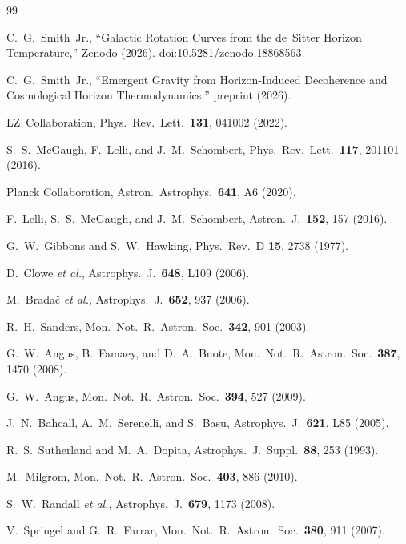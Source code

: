 \documentclass[aps,prd,twocolumn,superscriptaddress,nofootinbib]{revtex4-2}
\begin{document}
\begin{thebibliography}{99}

 C.~G.~Smith~Jr., ``Galactic Rotation Curves from the de~Sitter Horizon Temperature,'' Zenodo (2026). doi:10.5281/zenodo.18868563.

 C.~G.~Smith~Jr., ``Emergent Gravity from Horizon-Induced Decoherence and Cosmological Horizon Thermodynamics,'' preprint (2026).

 LZ~Collaboration, Phys.\ Rev.\ Lett.\ \textbf{131}, 041002 (2022).

 S.~S.~McGaugh, F.~Lelli, and J.~M.~Schombert, Phys.\ Rev.\ Lett.\ \textbf{117}, 201101 (2016).

 Planck Collaboration, Astron.\ Astrophys.\ \textbf{641}, A6 (2020).

 F.~Lelli, S.~S.~McGaugh, and J.~M.~Schombert, Astron.\ J.\ \textbf{152}, 157 (2016).

 G.~W.~Gibbons and S.~W.~Hawking, Phys.\ Rev.\ D \textbf{15}, 2738 (1977).

 D.~Clowe \emph{et al.}, Astrophys.\ J.\ \textbf{648}, L109 (2006).

 M.~Brada\v{c} \emph{et al.}, Astrophys.\ J.\ \textbf{652}, 937 (2006).

 R.~H.~Sanders, Mon.\ Not.\ R.\ Astron.\ Soc.\ \textbf{342}, 901 (2003).

 G.~W.~Angus, B.~Famaey, and D.~A.~Buote, Mon.\ Not.\ R.\ Astron.\ Soc.\ \textbf{387}, 1470 (2008).

 G.~W.~Angus, Mon.\ Not.\ R.\ Astron.\ Soc.\ \textbf{394}, 527 (2009).

 J.~N.~Bahcall, A.~M.~Serenelli, and S.~Basu, Astrophys.\ J.\ \textbf{621}, L85 (2005).

 R.~S.~Sutherland and M.~A.~Dopita, Astrophys.\ J.\ Suppl.\ \textbf{88}, 253 (1993).

 M.~Milgrom, Mon.\ Not.\ R.\ Astron.\ Soc.\ \textbf{403}, 886 (2010).

 S.~W.~Randall \emph{et al.}, Astrophys.\ J.\ \textbf{679}, 1173 (2008).

 V.~Springel and G.~R.~Farrar, Mon.\ Not.\ R.\ Astron.\ Soc.\ \textbf{380}, 911 (2007).


\end{thebibliography}
\end{document}
